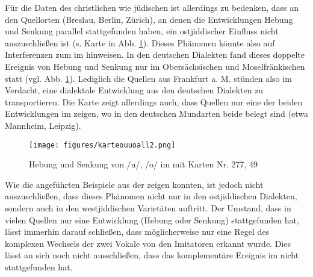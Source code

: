 Für die Daten des christlichen wie jüdischen  ist allerdings zu bedenken, dass an den Quellorten (Breslau, Berlin, Zürich), an denen die Entwicklungen Hebung und Senkung parallel stattgefunden haben, ein ostjiddischer Einfluss nicht auszuschließen ist (s. Karte in Abb. \ref{karteouuoall}). Dieses Phänomen könnte also auf Interferenzen zum  im  hinweisen. In den deutschen Dialekten fand dieses doppelte Ereignis von Hebung und Senkung nur im Obersächsischen und Moselfränkischen statt (vgl. Abb. \ref{karteouuoall}). Lediglich die Quellen aus Frankfurt a. M. stünden also im Verdacht, eine dialektale Entwicklung aus den deutschen Dialekten zu transportieren. Die Karte zeigt allerdings auch, dass Quellen nur eine der beiden Entwicklungen im  zeigen, wo in den deutschen Mundarten beide belegt sind (etwa Mannheim, Leipzig). \\
		
\begin{figure}[h!]
		\centering
\texttt{[image: figures/karteouuoall2.png]}
		\caption{\label{karteouuoall} Hebung und Senkung von /u/, /o/ im  mit  Karten Nr. 277, 49}
		\end{figure}
\FloatBarrier
		

Wie die angeführten Beispiele aus der  zeigen konnten, ist jedoch nicht auszuschließen, dass dieses Phänomen nicht nur in den ostjiddischen Dialekten, sondern auch in den westjiddischen Varietäten auftritt. Der Umstand, dass in vielen Quellen nur eine Entwicklung (Hebung oder Senkung) stattgefunden hat, lässt immerhin darauf schließen, dass möglicherweise nur eine Regel des komplexen Wechsels der zwei Vokale von den Imitatoren erkannt wurde. Dies lässt an sich noch nicht ausschließen, dass das komplementäre Ereignis im  nicht stattgefunden hat. \\


